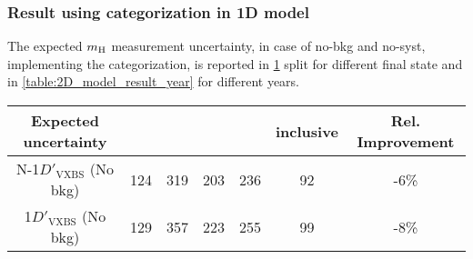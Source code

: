 \subsubsection{Result using categorization in 1D model}
The expected $m_{\mathrm{H}}$ measurement uncertainty, in case of no-bkg and no-syst,
implementing the categorization,
is reported in \cref{table:2D_model_result} split for different final state and in \cref{table:2D_model_result_year} for different years.
\begin{table}[ht]	
\begin{center}
    \begin{tabular}{ccccccc}
    \hline			
    Expected uncertainty	&	\fourmu	&	\foure	&	\twoetwomu	&\twomutwoe	& inclusive & Rel. Improvement \\
    \hline			
        N-1$D'_\text{VXBS}$ (No bkg)	&	124	&	319	&	203	&	236	&	92	&	-6\%	\\
        1$D'_\text{VXBS}$ (No bkg)	&	129	&	357	&	223	&	255	&	99	&	-8\%	\\
    \hline
    \end{tabular}
\label{table:2D_model_result}
\end{center}
\end{table}
